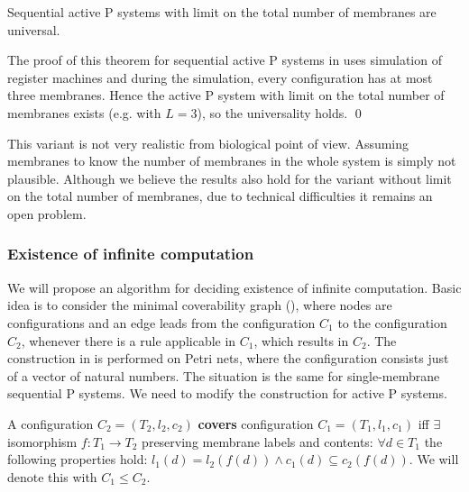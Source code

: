 \begin{veta}
  Sequential active P systems with limit on the total number of membranes are universal.
\end{veta}

\begin{dokaz}
  The proof of this theorem for sequential active P systems in \cite{Ibarra05Active} uses simulation of register machines and during the simulation, every configuration has at most three membranes. Hence the active P system with limit on the total number of membranes exists (e.g. with $L=3$), so the universality holds.
  \qed
\end{dokaz}

This variant is not very realistic from biological point of view. Assuming membranes to know the number of membranes in the whole system is simply not plausible. Although we believe the results also hold for the variant without limit on the total number of membranes, due to technical difficulties it remains an open problem.

\subsubsection{Existence of infinite computation} %
\label{ssub:existence_of_infinite_computation}

We will propose an algorithm for deciding existence of infinite computation. Basic idea is to consider the minimal coverability graph (\cite{Rozenberg93MinimalCoverabilityGraph}), where nodes are configurations and an edge leads from the configuration $C_1$ to the configuration $C_2$, whenever there is a rule applicable in $C_1$, which results in $C_2$. The construction in \cite{Rozenberg93MinimalCoverabilityGraph} is performed on Petri nets, where the configuration consists just of a vector of natural numbers. The situation is the same for single-membrane sequential P systems. We need to modify the construction for active P systems.

\begin{definition}
  A configuration $C_2 = (T_2, l_2, c_2)$ {\bf covers} configuration $C_1 = (T_1, l_1, c_1)$ iff $\exists$ isomorphism $f: T_1\rightarrow T_2$ preserving membrane labels and contents: $\forall d\in T_1$ the following properties hold: $l_1(d)=l_2(f(d))\wedge c_1(d)\subseteq c_2(f(d))$. We will denote this with $C_1\leq C_2$.
\end{definition}


